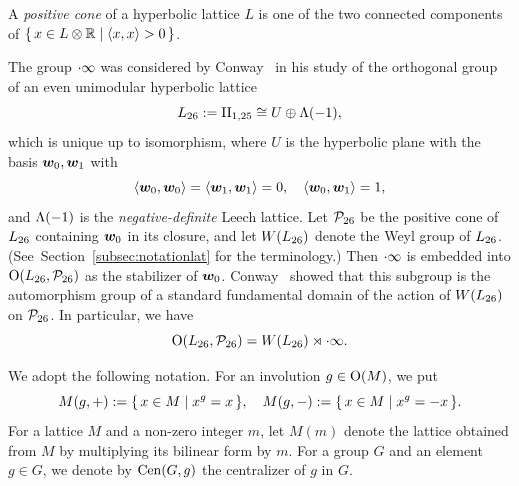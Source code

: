 \documentclass{amsart} %
\begin{document}
A \emph{positive cone} of a hyperbolic lattice $L$
is one of the two connected components 
of $\{\,{x\in L\otimes \mathord{\mathbb{R}}}\mid {\langle x, x \rangle>0} \,\}$.
\par
The group $\cdot \infty$ was considered by Conway~\cite{MR690711}
 in his study of the orthogonal group of an even unimodular hyperbolic lattice
 \[
 L_{26}:=\mathrm{II}_{1,25} \cong U\oplus \Lambda(-1), 
\]
which is unique up to isomorphism,
where $U$ is the hyperbolic plane with the basis $\boldsymbol{w}_0, \boldsymbol{w}_1$
with
%
\begin{equation}\label{eq:w0w1}
\langle \boldsymbol{w}_0, \boldsymbol{w}_0 \rangle=\langle \boldsymbol{w}_1, \boldsymbol{w}_1 \rangle=0, 
\quad \langle \boldsymbol{w}_0, \boldsymbol{w}_1 \rangle=1, 
\end{equation}
%
and $\Lambda(-1)$ is the \emph{negative-definite} Leech lattice.
Let $\mathord{\mathcal{P}}_{26}$ be 
the positive cone of $L_{26}$ containing $\boldsymbol{w}_0$ in its closure, 
and 
let $W(L_{26})$ denote the Weyl group of $L_{26}$.
(See~Section~\ref{subsec:notationlat} for the terminology.)
Then $\cdot \infty$ is embedded into $\mathord{\mathrm{O}}(L_{26}, \mathord{\mathcal{P}}_{26})$
as the stabilizer of $\boldsymbol{w}_0$.
Conway~\cite{MR690711} showed that 
 this subgroup is
the automorphism group
of a standard fundamental domain of the action of $W(L_{26})$ on $\mathord{\mathcal{P}}_{26}$.
In particular, we have 
\[
\mathord{\mathrm{O}}(L_{26}, \mathord{\mathcal{P}}_{26})= W(L_{26}) \rtimes\cdot \infty.
\]
\par
%
We adopt the following notation.
For an involution $g\in \mathord{\mathrm{O}}(M)$, we put
%
\begin{equation}\label{eq:Mgpm}
M(g, +):=\{\,{x\in M}\mid {x^g=x} \,\},
\quad
M(g, -):=\{\,{x\in M}\mid {x^g=-x} \,\}.
\end{equation}
%
For a lattice $M$ and a non-zero integer $m$,
let $M(m)$ denote the lattice obtained from $M$ by multiplying its bilinear form by
$m$.
For a group $G$ and an element $g\in G$,
we denote by $\mathrm{Cen}(G, g)$ the centralizer of $g$ in $G$.
%
%
\end{document}
